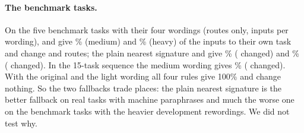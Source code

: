 \paragraph{The benchmark tasks.} On the five benchmark tasks with their four wordings (routes only, \RerouteBenchInputs{} inputs per wording), \cert{} and \nearest{} give \RerouteCertBenchFiveMediumOwn{}\% (medium) and \RerouteCertBenchFiveHeavyOwn{}\% (heavy)
of the inputs to their own task and change \RerouteCertBenchFiveMediumChanged{} and \RerouteCertBenchFiveHeavyChanged{} routes; the plain nearest signature and \hybrid{} give \RerouteSigBenchFiveMediumOwn{}\% (\RerouteSigBenchFiveMediumChanged{} changed) and \RerouteSigBenchFiveHeavyOwn{}\%
(\RerouteSigBenchFiveHeavyChanged{} changed). In the 15-task sequence the medium wording gives \RerouteSigBenchFifteenMediumOwn{}\% (\RerouteSigBenchFifteenMediumChanged{} changed). With the original and the light wording all four rules give 100\% and change nothing. So the two fallbacks trade places: the plain
nearest signature is the better fallback on real tasks with machine paraphrases and much the worse one on the benchmark tasks with the heavier development rewordings. We did not test why.

